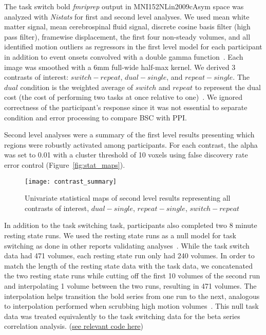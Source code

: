 \documentclass[phd,appendix,figures]{uithesis}
\begin{document}
The task switch bold \emph{fmriprep} output in MNI152NLin2009cAsym space
was analyzed with \emph{Nistats} for first and second level analyses.
We used mean white matter signal, mean cerebrospinal fluid signal,
discrete cosine basis filter (high pass filter), framewise displacement, the first four non-steady volumes, and
all identified motion outliers as regressors in the first level model for each participant
in addition to event onsets convolved with a double gamma function~\cite{Glover1999}.
Each image was smoothed with a 6mm full-wide half-max kernel.
We derived 3 contrasts of interest: $switch - repeat$, $dual- single$, and $repeat - single$.
The $dual$ condition is the weighted average of $switch$ and $repeat$ to represent the
dual cost (the cost of performing two tasks at once relative to one)~\cite{Wylie2000,Verhaeghen2003}.
We ignored correctness of the participant's response since it was not essential to
separate condition and error processing to compare BSC with PPI.

Second level analyses were a summary of the first level results presenting which
regions were robustly activated among participants.
For each contrast, the alpha was set to 0.01 with a cluster threshold of 10 voxels using
false discovery rate error control (Figure~\ref{fig:stat_maps}).

\begin{figure}[H]
  \centering
  \texttt{[image: contrast\_summary]}
  \caption[Univariate statistical maps]{
    Univariate statistical maps of second level results representing
    all contrasts of interest, $dual - single$, $repeat - single$, $switch - repeat$}
  \label{fig:stat_maps2}
\end{figure}

In addition to the task switching task, participants also completed
two 8 minute resting state runs.
We used the resting state runs as a null model for task switching as done
in other reports validating analyses~\cite{Eklund2016,Olszowy2019}.
While the task switch data had 471 volumes, each resting state run only had
240 volumes.
In order to match the length of the resting state data with the task data, we concatenated
the two resting state runs while cutting off the first 10 volumes of the second run
and interpolating 1 volume between the two runs, resulting in 471 volumes.
The interpolation helps transition the bold series from one run to the next,
analogous to interpolation performed when scrubbing high motion volumes~\cite{Power2014a}. 
This null task data was treated equivalently to the task switching data for the
beta series correlation analysis.
(\href{https://github.com/jdkent/validateBetaSeries/tree/195ad5b4201971038dbbf8f73a3c537caf032743}{see relevant code here})
\end{document}
